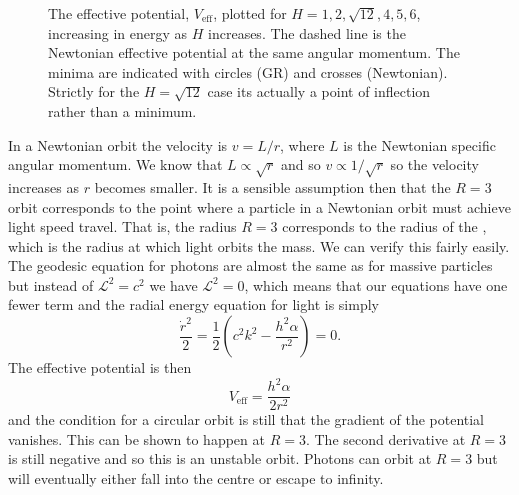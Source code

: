 \documentclass[fleqn]{NotesClass}
\newcommand*{\lagrangian}{\mathcal{L}}
\begin{document}
\begin{figure}
        \caption[Effective Schwarzschild potential.]{The effective potential, \(V_{\mathrm{eff}}\), plotted for \(H = 1, 2, \sqrt{12}, 4, 5, 6\), increasing in energy as \(H\) increases. The dashed line is the Newtonian effective potential at the same angular momentum. The minima are indicated with circles (GR) and crosses (Newtonian). Strictly for the \(H = \sqrt{12}\) case its actually a point of inflection rather than a minimum.}
        \label{fig:effective potential}
    \end{figure}
    
    In a Newtonian orbit the velocity is \(v = L/r\), where \(L\) is the Newtonian specific angular momentum.
    We know that \(L \propto \sqrt{r}\) and so \(v \propto 1/\sqrt{r}\) so the velocity increases as \(r\) becomes smaller.
    It is a sensible assumption then that the \(R = 3\) orbit corresponds to the point where a particle in a Newtonian orbit must achieve light speed travel.
    That is, the radius \(R = 3\) corresponds to the radius of the , which is the radius at which light orbits the mass.
    We can verify this fairly easily.
    The geodesic equation for photons are almost the same as for massive particles but instead of \(\lagrangian^2 = c^2\) we have \(\lagrangian^2 = 0\), which means that our equations have one fewer term and the radial energy equation for light is simply
    \begin{equation}
        \frac{\dot{r}^2}{2} = \frac{1}{2}\left( c^2k^2 - \frac{h^2\alpha}{r^2} \right) = 0.
    \end{equation}
    The effective potential is then
    \begin{equation}
        V_{\mathrm{eff}} = \frac{h^2\alpha}{2r^2}
    \end{equation}
    and the condition for a circular orbit is still that the gradient of the potential vanishes.
    This can be shown to happen at \(R = 3\).
    The second derivative at \(R = 3\) is still negative and so this is an unstable orbit.
    Photons can orbit at \(R = 3\) but will eventually either fall into the centre or escape to infinity.
    
\end{document}
